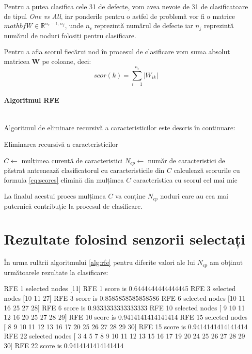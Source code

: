 Pentru a putea clasifica cele 31 de defecte, vom avea nevoie de 31 de clasificatoare de tipul \textit{One vs All}, iar ponderile pentru o astfel de problemă vor fi o matrice $mathbf{\textit{W}} \in \mathbb{R}^{n_{c}-1, n_{j}}$, unde $n_c$ reprezintă numărul de defecte iar $n_j$ reprezintă numărul de noduri folosiți pentru clasificare.

Pentru a afla scorul fiecărui nod în procesul de clasificare vom suma absolut matricea $\mathbf{W}$ pe coloane, deci:
\begin{equation}
    scor(k) = \sum_{i=1}^{n_c} |W_{ik}|
    \label{eq:scores}
\end{equation}

\paragraph{Algoritmul RFE} \mbox{} \\

Algoritmul de eliminare recursivă a caracteristicilor este descris în continuare:
\begin{algorithm2e}
\caption{Eliminarea recursivă a caracteristicilor}
\label{alg:rfe}
$C \leftarrow$ mulțimea curentă de caracteristici\;
$N_{cp} \leftarrow$ număr de caracteristici de păstrat\;
 {
    antrenează clasificatorul cu caracteristicile din $C$\;
    calculează scorurile cu formula \eqref{eq:scores}\;
    elimină din mulțimea $C$ caracteristica cu scorul cel mai mic
}
\end{algorithm2e}

La finalul acestui proces mulțimea $C$ va conține $N_{cp}$ noduri care au cea mai puternică contribuție la procesul de clasificare.

\section{Rezultate folosind senzorii selectați}

În urma rulării algoritmului \ref{alg:rfe} pentru diferite valori ale lui $N_{cp}$ am obținut următoarele rezultate la clasificare:

RFE 1 selected nodes [11]
RFE 1 score is 0.6444444444444445
RFE 3 selected nodes [10 11 27]
RFE 3 score is 0.8585858585858586
RFE 6 selected nodes [10 11 16 25 27 28]
RFE 6 score is 0.9333333333333333
RFE 10 selected nodes [ 9 10 11 12 16 20 25 27 28 29]
RFE 10 score is 0.9414141414141414
RFE 15 selected nodes [ 8  9 10 11 12 13 16 17 20 25 26 27 28 29 30]
RFE 15 score is 0.9414141414141414
RFE 22 selected nodes [ 3  4  5  7  8  9 10 11 12 13 15 16 17 19 20 24 25 26 27 28 29 30]
RFE 22 score is 0.9414141414141414